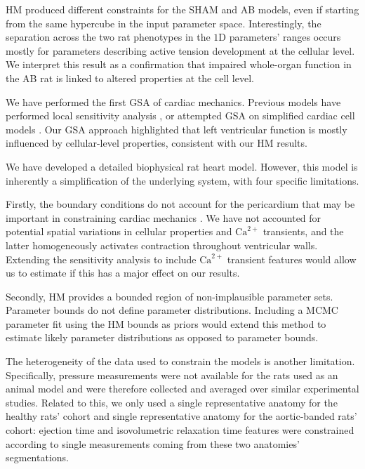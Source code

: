HM produced different constraints for the SHAM and AB models, even if starting from the same hypercube in the input parameter space. Interestingly, the separation across the two rat phenotypes in the $1$D parameters' ranges occurs mostly for parameters describing active tension development at the cellular level. We interpret this result as a confirmation that impaired whole-organ function in the AB rat is linked to altered properties at the cell level.

We have performed the first GSA of cardiac mechanics. Previous models have performed local sensitivity analysis \cite{Sher:2013}, or attempted GSA on simplified cardiac cell models \cite{Pathmanathan:2019}. Our GSA approach highlighted that left ventricular function is mostly influenced by cellular-level properties, consistent with our HM results.

\vspace{0.2cm}
We have developed a detailed biophysical rat heart model. However, this model is inherently a simplification of the underlying system, with four specific limitations.

Firstly, the boundary conditions do not account for the pericardium that may be important in constraining cardiac mechanics \cite{Strocchi:2020}. We have not accounted for potential spatial variations in cellular properties and $\textrm{Ca}^{2+}$ transients, and the latter homogeneously activates contraction throughout ventricular walls. Extending the sensitivity analysis to include $\textrm{Ca}^{2+}$ transient features would allow us to estimate if this has a major effect on our results.

Secondly, HM provides a bounded region of non-implausible parameter sets. Parameter bounds do not define parameter distributions. Including a MCMC parameter fit using the HM bounds as priors would extend this method to estimate likely parameter distributions as opposed to parameter bounds.

The heterogeneity of the data used to constrain the models is another limitation. Specifically, pressure measurements were not available for the rats used as an animal model and were therefore collected and averaged over similar experimental studies. Related to this, we only used a single representative anatomy for the healthy rats' cohort and single representative anatomy for the aortic-banded rats' cohort: ejection time and isovolumetric relaxation time features were constrained according to single measurements coming from these two anatomies' segmentations.

